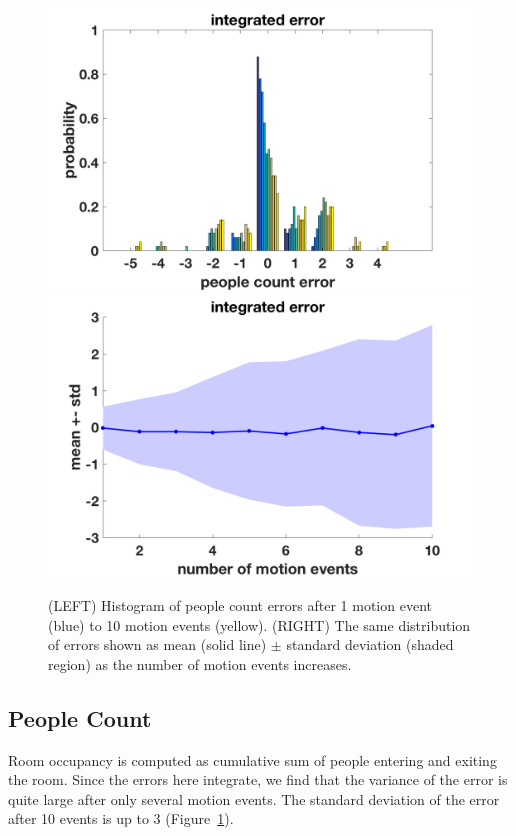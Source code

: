 \documentclass[12pt,oneside]{article} %
\begin{document}
\begin{figure}[!htb]
\includegraphics[scale=0.35]{images/pcerror_gamma020_hist.png}
\includegraphics[scale=0.35]{images/pcerror_gamma020.png}
\caption{(LEFT) Histogram of people count errors after 1 motion event (blue) to 10 motion events (yellow). (RIGHT) The same distribution of errors shown as mean (solid line) $\pm$ standard deviation (shaded region) as the number of motion events increases.}
\label{hist}
\end{figure}

\clearpage
\subsection{People Count}
Room occupancy is computed as cumulative sum of people entering and exiting the room. Since the errors here
integrate, we find that the variance of the error is quite large after only several motion events.
The standard deviation of the error after 10 events is up to 3 (Figure~\ref{hist}).
\end{document}
